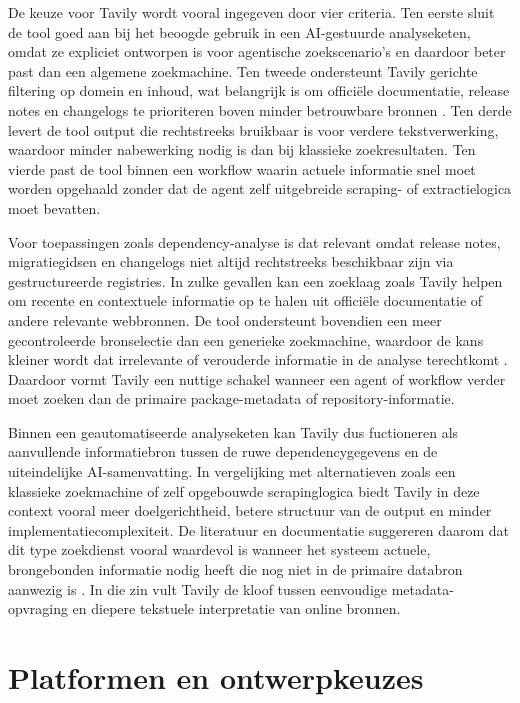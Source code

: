 De keuze voor Tavily wordt vooral ingegeven door vier criteria. Ten eerste sluit de tool goed aan bij het beoogde gebruik in een AI-gestuurde analyseketen, omdat ze expliciet ontworpen is voor agentische zoekscenario's en daardoor beter past dan een algemene zoekmachine. Ten tweede ondersteunt Tavily gerichte filtering op domein en inhoud, wat belangrijk is om  officiële documentatie, release notes en changelogs te prioriteren boven minder betrouwbare bronnen \textcite{TavilyBestPractices2026,TavilyDocs2026}. Ten derde levert de tool output die rechtstreeks bruikbaar is voor verdere tekstverwerking, waardoor minder nabewerking nodig is dan bij klassieke zoekresultaten. Ten vierde past de tool binnen een workflow waarin actuele informatie snel moet worden opgehaald zonder dat de agent zelf uitgebreide scraping- of extractielogica moet bevatten.

Voor toepassingen zoals dependency-analyse is dat relevant omdat release notes, migratiegidsen en changelogs niet altijd rechtstreeks beschikbaar zijn via gestructureerde registries. In zulke gevallen kan een zoeklaag zoals Tavily helpen om recente en contextuele informatie op te halen uit officiële documentatie of andere relevante webbronnen. De tool ondersteunt bovendien een meer gecontroleerde bronselectie dan een generieke zoekmachine, waardoor de kans kleiner wordt dat irrelevante of verouderde informatie in de analyse terechtkomt \textcite{TavilyBestPractices2026,TavilyDocs2026}. Daardoor vormt Tavily een nuttige schakel wanneer een agent of workflow verder moet zoeken dan de primaire package-metadata of repository-informatie.

Binnen een geautomatiseerde analyseketen kan Tavily dus fuctioneren als aanvullende informatiebron tussen de ruwe dependencygegevens en de uiteindelijke AI-samenvatting. In vergelijking met alternatieven zoals een klassieke zoekmachine of zelf opgebouwde scrapinglogica biedt Tavily in deze context vooral meer doelgerichtheid, betere structuur van de output en minder implementatiecomplexiteit. De literatuur en documentatie suggereren daarom dat dit type zoekdienst vooral waardevol is wanneer het systeem actuele, brongebonden informatie nodig heeft die nog niet in de primaire databron aanwezig is \textcite{TavilySearch2026,TavilyIntro2026}. In die zin vult Tavily de kloof tussen eenvoudige metadata-opvraging en diepere tekstuele interpretatie van online bronnen.

\section{Platformen en ontwerpkeuzes}
\label{sec:platformen-keuzes}

